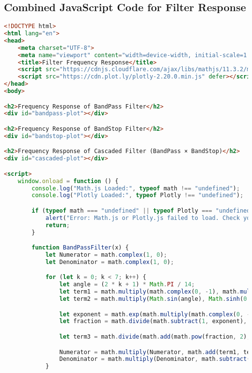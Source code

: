 \documentclass{article}
\begin{document}
\subsection{Combined JavaScript Code for Filter Response}
\begin{lstlisting}[language=HTML, caption=Filter Type Definition]
<!DOCTYPE html>
<html lang="en">
<head>
    <meta charset="UTF-8">
    <meta name="viewport" content="width=device-width, initial-scale=1.0">
    <title>Filter Frequency Response</title>
    <script src="https://cdnjs.cloudflare.com/ajax/libs/mathjs/11.3.2/math.js" defer></script>
    <script src="https://cdn.plot.ly/plotly-2.20.0.min.js" defer></script>
</head>
<body>

<h2>Frequency Response of BandPass Filter</h2>
<div id="bandpass-plot"></div>

<h2>Frequency Response of BandStop Filter</h2>
<div id="bandstop-plot"></div>

<h2>Frequency Response of Cascaded Filter (BandPass × BandStop)</h2>
<div id="cascaded-plot"></div>

<script>
    window.onload = function () {
        console.log("Math.js Loaded:", typeof math !== "undefined");
        console.log("Plotly Loaded:", typeof Plotly !== "undefined");

        if (typeof math === "undefined" || typeof Plotly === "undefined") {
            alert("Error: Math.js or Plotly.js failed to load. Check your internet connection.");
            return;
        }

        function BandPassFilter(x) {
            let Numerator = math.complex(1, 0);
            let Denominator = math.complex(1, 0);

            for (let k = 0; k < 7; k++) {
                let angle = (2 * k + 1) * Math.PI / 14;
                let term1 = math.multiply(math.complex(0, -1), math.multiply(Math.cos(angle), Math.cosh(0.227540122101)));
                let term2 = math.multiply(Math.sin(angle), Math.sinh(0.227540122101));

                let exponent = math.exp(math.multiply(math.complex(0, -1), x));
                let fraction = math.divide(math.subtract(1, exponent), math.add(1, exponent));

                let term3 = math.divide(math.add(math.pow(fraction, 2), 0.918), math.multiply(1.59, fraction));

                Numerator = math.multiply(Numerator, math.add(term1, term2));
                Denominator = math.multiply(Denominator, math.subtract(math.subtract(term3, term1), term2));
            }


\end{lstlisting}
\end{document}
